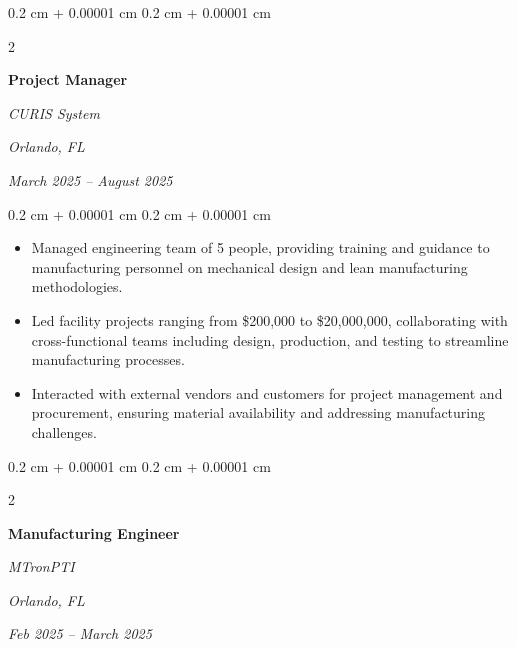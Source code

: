 \documentclass[10pt, letterpaper]{article}
\newenvironment{highlights}{
    \begin{itemize}[
        topsep=0.10 cm,
        parsep=0.10 cm,
        partopsep=0pt,
        itemsep=0pt,
        leftmargin=0.4 cm + 10pt
    ]
}{
    \end{itemize}
} %
\newenvironment{onecolentry}{
    \begin{adjustwidth}{
        0.2 cm + 0.00001 cm
    }{
        0.2 cm + 0.00001 cm
    }
}{
    \end{adjustwidth}
} %
\newenvironment{twocolentry}[2][]{
    \onecolentry
    \def\secondColumn{#2}
    \setcolumnwidth{\fill, 9.0 cm}
    \begin{paracol}{2}
}{
    \switchcolumn \raggedleft \secondColumn
    \end{paracol}
    \endonecolentry
} %
\begin{document}
        \vspace{0.35 cm}

        \begin{twocolentry}{
        \textit{Orlando, FL}    
            
        \textit{March 2025 – August 2025}}
            \textbf{Project Manager}
            
            \textit{CURIS System}
        \end{twocolentry}

        \vspace{0.10 cm}
        \begin{onecolentry}
            \begin{highlights}
                \item Managed engineering team of 5 people, providing training and guidance to manufacturing personnel on mechanical design and lean manufacturing methodologies.
                \item Led facility projects ranging from \$200,000 to \$20,000,000, collaborating with cross-functional teams including design, production, and testing to streamline manufacturing processes.
                \item Interacted with external vendors and customers for project management and procurement, ensuring material availability and addressing manufacturing challenges.
            \end{highlights}
        \end{onecolentry}


        \vspace{0.35 cm}

        
        \begin{twocolentry}{
        \textit{Orlando, FL}    
            
        \textit{Feb 2025 – March 2025}}
            \textbf{Manufacturing Engineer}
            
            \textit{MTronPTI}
        \end{twocolentry}
\end{document}
